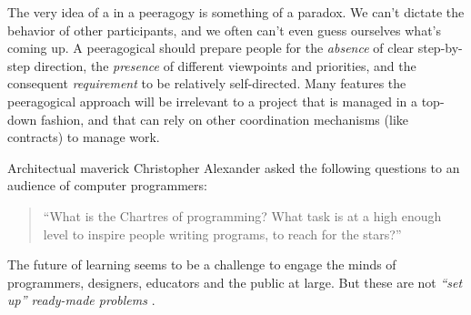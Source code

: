 The very idea of a  in a peeragogy is something
of a paradox.  We can't dictate the behavior of other participants,
and we often can't even guess ourselves what's coming up.  A
peeragogical  should prepare people for the
\emph{absence} of clear step-by-step direction, the \emph{presence} of
different viewpoints and priorities, and the consequent
\emph{requirement} to be relatively self-directed.  Many features the
peeragogical approach will be irrelevant to a project that is managed
in a top-down fashion, and that can rely on other coordination
mechanisms (like contracts) to manage work.

Architectual maverick Christopher Alexander asked the following
questions to an audience of computer programmers:
\begin{quote}
``What is the Chartres of programming? What task is at a high enough level to inspire people writing programs, to reach for the stars?'' \cite{alexander1999origins}
\end{quote}

The future of learning seems to be a challenge to engage the minds of
programmers, designers, educators and the public at large.  But these are
not \emph{``set up'' ready-made problems} \cite[p.~15]{deleuze1991bergsonism}.



